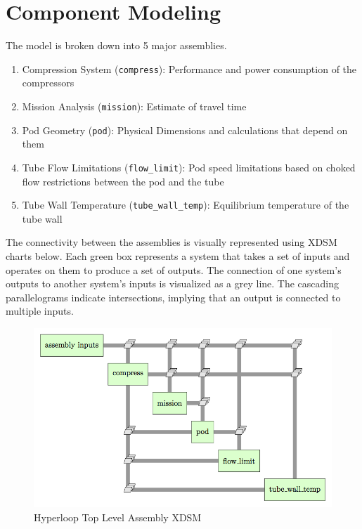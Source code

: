 \documentclass[heading.tex]{subfiles}
\begin{document}
\section{Component Modeling}
The model is broken down into 5 major assemblies. 

\begin{enumerate}
  \item Compression System (\texttt{compress}): Performance and power consumption of the compressors
  \item Mission Analysis (\texttt{mission}): Estimate of travel time
  \item Pod Geometry (\texttt{pod}): Physical Dimensions and calculations that depend on them
  \item Tube Flow Limitations (\texttt{flow\_limit}): Pod speed limitations based on choked flow restrictions between the pod and the tube
  \item Tube Wall Temperature (\texttt{tube\_wall\_temp}): Equilibrium temperature of the tube wall
\end{enumerate}

The connectivity between the assemblies is visually represented using XDSM charts below. Each green box represents a system that takes a set of inputs and operates on them to produce a set of outputs. The connection of one system's outputs to another system's inputs is visualized as a grey line. The cascading parallelograms indicate intersections, implying that an output is connected to multiple inputs. 


\begin{figure}[hbtp]
\centering
\includegraphics[scale=1]{images/hyperloop_assembly_xdsm.png}
\caption{Hyperloop Top Level Assembly XDSM}
\label{f:hyperloopXDSM}
\end{figure}
\end{document}
